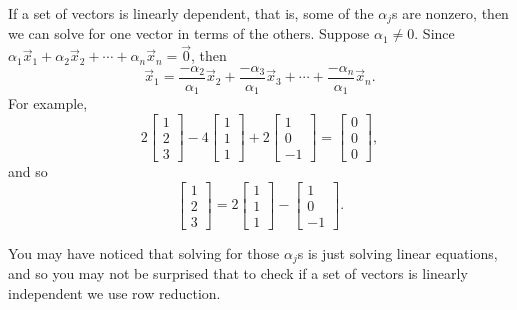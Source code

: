If a set of vectors is linearly dependent, that is, some of the $\alpha_j$s
are nonzero, then we can solve for one vector in terms of the others.
Suppose $\alpha_1 \neq 0$.  Since
$\alpha_1 \vec{x}_1 +
\alpha_2 \vec{x}_2 +
\cdots +
\alpha_n \vec{x}_n
=
\vec{0}$, then
\begin{equation*}
\vec{x}_1
=
\frac{-\alpha_2}{\alpha_1}
\vec{x}_2 +
\frac{-\alpha_3}{\alpha_1}
\vec{x}_3 +
\cdots +
\frac{-\alpha_n}{\alpha_1}
\vec{x}_n .
\end{equation*}
For example,
\begin{equation*}
2
\begin{bmatrix} 1 \\ 2 \\ 3 \end{bmatrix}
-4
\begin{bmatrix} 1 \\ 1 \\ 1 \end{bmatrix}
+
2 \begin{bmatrix} 1 \\ 0 \\ -1 \end{bmatrix}
=
\begin{bmatrix} 0 \\ 0 \\ 0 \end{bmatrix} ,
\end{equation*}
and so
\begin{equation*}
\begin{bmatrix} 1 \\ 2 \\ 3 \end{bmatrix}
=
2
\begin{bmatrix} 1 \\ 1 \\ 1 \end{bmatrix}
-
\begin{bmatrix} 1 \\ 0 \\ -1 \end{bmatrix} .
\end{equation*}

You may have noticed that solving for those $\alpha_j$s is just solving
linear equations, and so you may not be surprised that to check
if a set of vectors is linearly independent we use row reduction.

